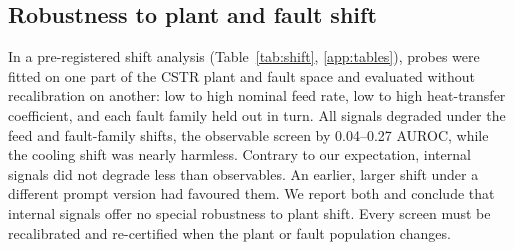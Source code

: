 \subsection{Robustness to plant and fault shift}\label{sec:res-shift}
In a pre-registered shift analysis (Table~\ref{tab:shift}, \ref{app:tables}), probes were fitted on one
part of the CSTR plant and fault space and evaluated without recalibration on another: low to high nominal feed
rate, low to high heat-transfer coefficient, and each fault family held out in turn. All signals degraded under
the feed and fault-family shifts, the observable screen by 0.04--0.27 AUROC, while the cooling shift was nearly
harmless. Contrary to our expectation, internal signals did not degrade less than observables. An earlier, larger
shift under a different prompt version had favoured them. We report both and conclude that internal signals
offer no special robustness to plant shift. Every screen must be recalibrated and re-certified when the plant or
fault population changes.

